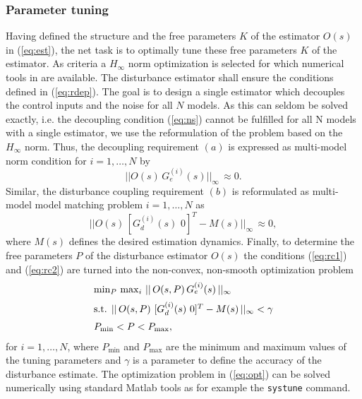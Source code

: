 \documentclass[graybox]{svmult}
\begin{document}
\subsubsection{Parameter tuning}\label{sec:tuning}
Having defined the structure and the free parameters $K$ of the estimator $O(s)$ in (\ref{eq:est}), the net task is to optimally tune these free parameters $K$ of the estimator. As criteria a $H_\infty$ norm optimization is selected for which numerical tools in \matlab are available. The disturbance estimator shall ensure the conditions defined in (\ref{eq:rdep}). The goal is to design a single estimator which decouples the control inputs and the noise for all $N$ models. As this can seldom be solved exactly, i.e. the decoupling condition (\ref{eq:ns}) cannot be fulfilled for all N models with a single estimator, we use the reformulation of the problem based on the $H_\infty$ norm. Thus, the decoupling requirement $(a)$ is expressed as  multi-model norm condition for  $i=1,\dots,N$ by
\begin{equation}\label{eq:rc1}
||O(s) \, G_e^{(i)}(s) ||_\infty  \,\approx 0.
\end{equation}
Similar, the disturbance coupling requirement $(b)$ is reformulated as multi-model model matching problem  $i=1,\dots,N$ as
\begin{equation}\label{eq:rc2}
|| O(s) \, [ G_d^{(i)}(s) \,\, 0 ]^T - M(s) ||_\infty \,\approx 0,
\end{equation}
where $M(s)$ defines the desired estimation dynamics. Finally, to determine the free parameters $P$ of the disturbance estimator $O(s)$ the conditions (\ref{eq:rc1}) and (\ref{eq:rc2}) are turned into the non-convex, non-smooth optimization problem
\begin{equation} \label{eq:opt}
\begin{array}{l}
\min_{P} \, \max_{i} \, || \, O(s,P) \, G_e^{(i)}(s) \, ||_\infty \vspace{+2mm} \\
\textnormal{s.t. } ||\, O(s,P) \,\, [ G_d^{(i)}(s) \,\, 0 ]^T - M(s) \, ||_\infty < \gamma \vspace{+2mm} \\
P_{\min} < P < P_{\max},
\end{array}
\end{equation}
for $i=1,\dots,N$, where $P_{\min}$ and $P_{\max}$ are the minimum and maximum values of the tuning parameters and $\gamma$ is a parameter to define the accuracy of the disturbance estimate. The optimization problem in (\ref{eq:opt}) can be  solved numerically using standard Matlab tools as for example the \texttt{systune} command.
\end{document}
